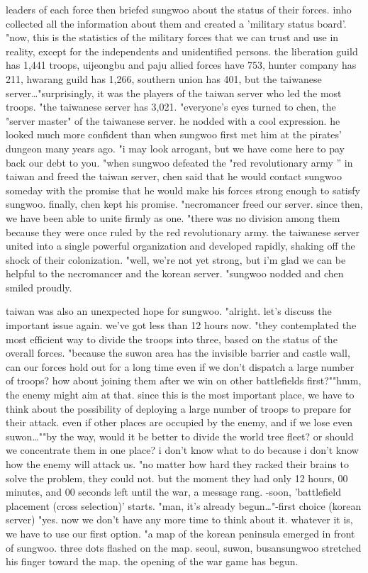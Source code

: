  leaders of each force then briefed sungwoo about the status of their forces.
 inho collected all the information about them and created a 'military status board'.
"now, this is the statistics of the military forces that we can trust and use in reality, except for the independents and unidentified persons.
 the liberation guild has 1,441 troops, uijeongbu and paju allied forces have 753, hunter company has 211, hwarang guild has 1,266, southern union has 401, but the taiwanese server…"surprisingly, it was the players of the taiwan server who led the most troops.
"the taiwanese server has 3,021.
"everyone's eyes turned to chen, the "server master" of the taiwanese server.
 he nodded with a cool expression.
 he looked much more confident than when sungwoo first met him at the pirates' dungeon many years ago.
"i may look arrogant, but we have come here to pay back our debt to you.
"when sungwoo defeated the "red revolutionary army '' in taiwan and freed the taiwan server, chen said that he would contact sungwoo someday with the promise that he would make his forces strong enough to satisfy sungwoo.
 finally, chen kept his promise.
"necromancer freed our server.
 since then, we have been able to unite firmly as one.
"there was no division among them because they were once ruled by the red revolutionary army.
 the taiwanese server united into a single powerful organization and developed rapidly, shaking off the shock of their colonization.
 "well, we're not yet strong, but i'm glad we can be helpful to the necromancer and the korean server.
"sungwoo nodded and chen smiled proudly.
 

taiwan was also an unexpected hope for sungwoo.
 "alright.
 let's discuss the important issue again.
 we've got less than 12 hours now.
"they contemplated the most efficient way to divide the troops into three, based on the status of the overall forces.
"because the suwon area has the invisible barrier and castle wall, can our forces hold out for a long time even if we don't dispatch a large number of troops? how about joining them after we win on other battlefields first?""hmm, the enemy might aim at that.
 since this is the most important place, we have to think about the possibility of deploying a large number of troops to prepare for their attack.
 even if other places are occupied by the enemy, and if we lose even suwon…""by the way, would it be better to divide the world tree fleet? or should we concentrate them in one place? i don't know what to do because i don't know how the enemy will attack us.
"no matter how hard they racked their brains to solve the problem, they could not.
 but the moment they had only 12 hours, 00 minutes, and 00 seconds left until the war, a message rang.
 -soon, 'battlefield placement (cross selection)' starts.
"man, it's already begun…"-first choice (korean server) "yes.
 now we don't have any more time to think about it.
 whatever it is, we have to use our first option.
"a map of the korean peninsula emerged in front of sungwoo.
 three dots flashed on the map.
seoul, suwon, busansungwoo stretched his finger toward the map.
the opening of the war game has begun.


 